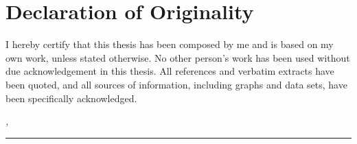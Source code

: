 %
\chapter*{Declaration of Originality}
\label{sec:declaration}
\thispagestyle{empty}
I hereby certify that this thesis has been composed by me and is based on my own work, unless stated otherwise.
No other person's work has been used without due acknowledgement in this thesis.
All references and verbatim extracts have been quoted, and all sources of information, including graphs and data sets, have been specifically acknowledged.
\bigskip

\noindent\textit{\thesisUniversityCity, \thesisDate}

\smallskip

\begin{flushright}
	\begin{minipage}{5cm}
		\rule{\textwidth}{1pt}
		\centering\thesisName{}
	\end{minipage}
\end{flushright}

